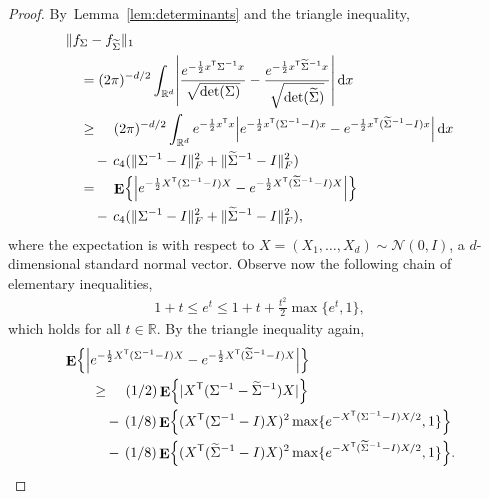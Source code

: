 \documentclass[letterpaper]{amsart}
\DeclarePairedDelimiter{\norm}{\lVert}{\rVert}
\newcommand{\sN}{\mathcal{N}}
\newcommand{\R}{\mathbb{R}}
\DeclareMathOperator{\E}{\mathbf{E}}
\let\originalleft\left
\let\originalright\right
\def\left#1{\mathopen{}\originalleft#1}
\def\right#1{\originalright#1\mathclose{}}
\newcommand{\dif}{\mathop{}\!\mathrm{d}}
\newcommand{\eqlabel}[1]{\label{eq:#1}}
\numberwithin{thm}{section}
\newcommand{\lemref}[1]{Lemma~\ref{lem:#1}}
\theoremstyle{definition}
\theoremstyle{plain}
\renewcommand{\tilde}[1]{\widetilde{#1}}
\newcommand{\transpose}{^{\mathsf{T}}}
\begin{document}
\begin{proof}
  By~\lemref{determinants} and the triangle inequality,
  \begin{align*}
    &\norm{f_\Sigma - f_{\tilde{\Sigma}}}_1 \\
    &\quad = (2\pi)^{-d/2} \int_{\R^d} \left| \frac{e^{ - \frac{1}{2} x\transpose \Sigma^{-1} x}}{\sqrt{\det(\Sigma)}} - \frac{e^{-\frac{1}{2} x\transpose \tilde{\Sigma}^{-1} x}}{\sqrt{\det(\tilde{\Sigma})}} \right|  \dif x \\
    &\quad \ge \hspace{1.1em} (2\pi)^{-d/2} \int_{\R^d} e^{-\frac{1}{2} x\transpose x} \left| e^{-\frac{1}{2} x\transpose(\Sigma^{-1} - I) x} - e^{-\frac{1}{2}x\transpose (\tilde{\Sigma}^{-1} - I)x}\right| \dif x \\
    &\quad \quad -\, c_4 (\|\Sigma^{-1} - I\|_F^2 + \|\tilde{\Sigma}^{-1} - I\|_F^2) \\
    &\quad = \hspace{1.1em} \E\left\{ \left|e^{-\frac{1}{2} X\transpose (\Sigma^{-1} - I) X} - e^{-\frac{1}{2} X\transpose (\tilde{\Sigma}^{-1} - I) X}\right| \right\} \\
    &\quad \quad -\, c_4 (\|\Sigma^{-1} - I\|_F^2 + \|\tilde{\Sigma}^{-1} - I\|_F^2) ,
  \end{align*}
  where the expectation is with respect to
  $X = (X_1, \dots, X_d) \sim \sN(0, I)$, a $d$-dimensional standard
  normal vector. Observe now the following chain of elementary
  inequalities,
  \begin{align}
    1 + t  \le e^t \le 1 + t + \frac{t^2}{2} \max\{e^t, 1\} , \eqlabel{exp-frieze}
  \end{align}
  which holds for all $t \in \R$. By the triangle inequality again,
  \begin{align}
    &\E\left\{ \left|e^{-\frac{1}{2} X\transpose (\Sigma^{-1} - I) X} - e^{-\frac{1}{2} X\transpose (\tilde{\Sigma}^{-1} - I) X}\right| \right\} \notag \\
    &\qquad \ge \hspace{1.1em} (1/2) \E\left\{|X\transpose (\Sigma^{-1} - \tilde{\Sigma}^{-1})X|\right\} \eqlabel{threelineexpression}\\
                                                  &\qquad \quad -\, (1/8) \E\left\{ (X\transpose (\Sigma^{-1} - I)X)^2 \max\{e^{-X\transpose (\Sigma^{-1} - I) X/2}, 1\} \right\} \eqlabel{normal-l1-term-2} \\
                                                &\qquad \quad -\, (1/8) \E\left\{ (X\transpose (\tilde{\Sigma}^{-1} - I)X)^2 \max\{e^{- X\transpose (\tilde{\Sigma}^{-1} - I) X/2}, 1\} \right\} . \eqlabel{normal-l1-term-3}

\end{align}
\end{proof}
\end{document}
